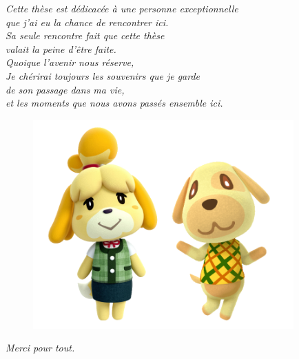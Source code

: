 \thispagestyle{empty}

\vspace*{3cm}

\begin{center}
	\textit{
    Cette thèse est dédicacée à une personne exceptionnelle\\
    que j'ai eu la chance de rencontrer ici.\\
    Sa seule rencontre fait que cette thèse\\
    valait la peine d'être faite.\\
    Quoique l'avenir nous réserve,\\
    Je chérirai toujours les souvenirs que je garde\\
    de son passage dans ma vie,\\
    et les moments que nous avons passés ensemble ici.}\\
    \vspace*{3cm}
    \begin{figure}[h]
        \centering
        \includegraphics[width=10cm]{pictures/AnimalCrossing_merged.png}
    \end{figure}
    \vspace*{3cm}
    \textit{Merci pour tout.}
\end{center}

